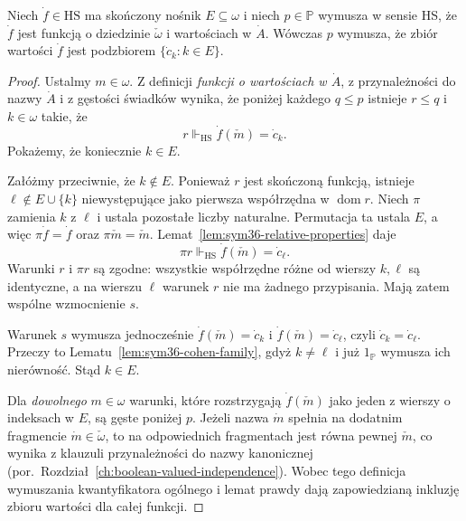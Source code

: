\begin{lemat}
\label{lem:sym36-finite-range}
Niech $\dot f\in\mathrm{HS}$ ma skończony
nośnik $E\subseteq\omega$ i niech
$p\in\mathbb P$ wymusza w sensie HS,
że $\dot f$ jest funkcją o dziedzinie
$\check\omega$ i wartościach w $\dot A$.
Wówczas $p$ wymusza, że zbiór wartości
$\dot f$ jest podzbiorem
$\{\dot c_k:k\in E\}$.
\end{lemat}
\begin{proof}
Ustalmy $m\in\omega$.
Z definicji \emph{funkcji o wartościach w $\dot A$},
z przynależności do nazwy
$\dot A$ i z gęstości świadków wynika,
że poniżej każdego $q\le p$ istnieje
$r\le q$ i $k\in\omega$ takie, że
\[
 r\Vdash_{\mathrm{HS}}
 \dot f(\check m)=\dot c_k.
\]
Pokażemy, że koniecznie $k\in E$.

Załóżmy przeciwnie, że $k\notin E$.
Ponieważ $r$ jest skończoną funkcją,
istnieje $\ell\notin E\cup\{k\}$
niewystępujące jako pierwsza
współrzędna w $\operatorname{dom}r$.
Niech $\pi$ zamienia $k$ z $\ell$
i ustala pozostałe liczby naturalne.
Permutacja ta ustala $E$, a więc
$\pi\dot f=\dot f$ oraz
$\pi\check m=\check m$.
Lemat~\ref{lem:sym36-relative-properties}
daje
\[
 \pi r\Vdash_{\mathrm{HS}}
  \dot f(\check m)=\dot c_\ell.
\]
Warunki $r$ i $\pi r$ są zgodne:
wszystkie współrzędne różne od
wierszy $k,\ell$ są identyczne,
a na wierszu $\ell$ warunek $r$
nie ma żadnego przypisania.
Mają zatem wspólne wzmocnienie $s$.

Warunek $s$ wymusza jednocześnie
$\dot f(\check m)=\dot c_k$
i $\dot f(\check m)=\dot c_\ell$,
czyli $\dot c_k=\dot c_\ell$.
Przeczy to Lematu~\ref{lem:sym36-cohen-family},
gdyż $k\ne\ell$ i już
$1_{\mathbb P}$ wymusza ich nierówność.
Stąd $k\in E$.

Dla \emph{dowolnego} $m\in\omega$
warunki, które rozstrzygają
$\dot f(\check m)$ jako jeden z wierszy
o indeksach w $E$, są gęste poniżej $p$.
Jeżeli nazwa $\dot m$ spełnia na dodatnim
fragmencie $\dot m\in\check\omega$,
to na odpowiednich fragmentach jest równa
pewnej $\check m$, co wynika z klauzuli
przynależności do nazwy kanonicznej
(por.\ Rozdział~\ref{ch:boolean-valued-independence}).
Wobec tego definicja wymuszania
kwantyfikatora ogólnego i lemat prawdy
dają zapowiedzianą inkluzję zbioru
wartości dla całej funkcji.
\end{proof}

